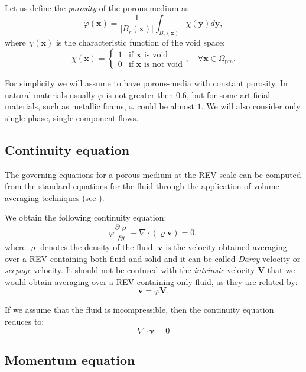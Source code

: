 Let us define the \emph{porosity} of the porous-medium as
\begin{equation}
\varphi(\mathbf{x}) = \frac{1}{|B_r(\mathbf{x})|} \int_{B_r(\mathbf{x})} \chi 
(\mathbf{y}) d\mathbf{y},
\end{equation}
where $\chi(\mathbf{x})$ is the characteristic function of the void space:
\begin{equation}
\chi(\mathbf{x}) =
\begin{cases}
1 &\text{if $\mathbf{x}$ is void}\\
0 &\text{if $\mathbf{x}$ is not void}
\end{cases}, \quad \forall \mathbf{x} \in \Omega_\text{pm}.
\end{equation}

For simplicity we will assume to have porous-media with constant porosity. In 
natural materials usually $\varphi$ is not greater then $0.6$, but for some 
artificial materials, such as metallic foams, $\varphi$ could be almost $1$.
We will also consider only single-phase, single-component flows.
%
\subsection{Continuity equation}
The governing equations for a porous-medium at the REV scale can be computed 
from the standard equations for the fluid through the application of volume 
averaging techniques (see \cite{volaver:withakerbook}).

We obtain the following continuity equation:
\begin{equation}
\varphi\frac{\partial \varrho}{\partial t} + \nabla \cdot (\varrho 
\mathbf{v}) = 0,
\end{equation}
where $\varrho$ denotes the density of the fluid. $\mathbf{v}$ is the velocity 
obtained averaging over a REV containing both fluid and solid and it can be 
called \emph{Darcy} velocity or \emph{seepage} velocity. It should not be 
confused with the \emph{intrinsic} velocity $\mathbf{V}$ that we would obtain 
averaging over a REV containing only fluid, as they are related by:
\begin{equation}
	\mathbf{v} = \varphi \mathbf{V}.
\end{equation}

If we assume that the fluid is incompressible, then the continuity equation 
reduces to:
\begin{equation}
\nabla \cdot \mathbf{v} = 0
\end{equation}
\subsection{Momentum equation}
